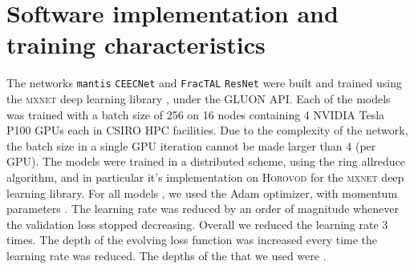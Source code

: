 \documentclass[times, 5p]{elsarticle}
\def \FracTAL {\texttt{FracTAL} }
\newcommand{\ceecnet}{\texttt{CEECNet}}
\newcommand{\mantis}{\texttt{mantis}}
\begin{document}
\section{Software implementation and training characteristics}
\label{resuneta_babysitting}
The networks 
\mantis{} \ceecnet{} and \FracTAL \texttt{ResNet}   were built and trained using the \textsc{mxnet} deep learning library \citep{chen2015mxnet}, under the \textsc{GLUON} API. Each of the models  was trained with a batch size of 256 on 16 nodes containing 4 NVIDIA Tesla P100 GPUs each in CSIRO HPC facilities. Due to the complexity of the network, the batch size in a single GPU iteration cannot be made larger than 4 (per GPU). The models were trained in a  distributed scheme, using the ring 
allreduce algorithm, and in particular it's implementation on \textsc{Horovod} \citep{sergeev2018horovod} for the \textsc{mxnet} \citep{chen2015mxnet} deep learning library. 
For all models , we used the Adam \citep{DBLP:journals/corr/KingmaB14} optimizer, with  momentum parameters .  
The learning rate was reduced by an order of magnitude  whenever the validation loss stopped decreasing.  Overall we reduced the learning rate 3 times. The depth of the evolving loss function was increased every time the learning rate was reduced. The depths of the  that we used were . 
 
\end{document}
